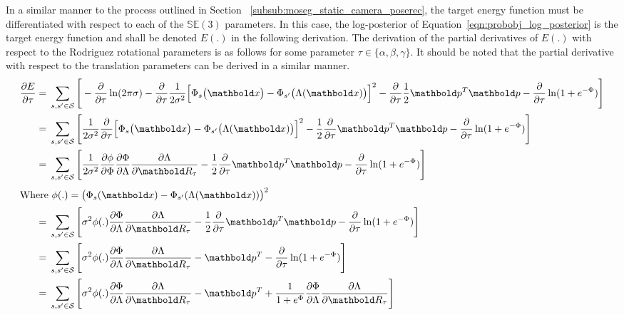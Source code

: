 In a similar manner to the process outlined in Section
~\ref{subsub:moseg_static_camera_poserec}, the target energy function must be
differentiated with respect to each of the \(\mathbb{SE}(3)\) parameters. In this
case, the log-posterior of Equation~\ref{eqn:probobj_log_posterior} is the
target energy function and shall be denoted \(E(.)\) in the following derivation.
The derivation of the partial derivatives of \(E(.)\) with respect
to the Rodriguez rotational parameters is as follows for some parameter
\( \tau \in \{ \alpha, \beta, \gamma \} \). It should be noted that the partial 
derivative with respect to the translation parameters can be derived in a similar 
manner.
\begin{align}
  \label{eqn:probobj_log_post_rot_grad}
  \frac{\partial E}{\partial \tau} ={}&
  \sum_{s, s' \in \mathcal{S}} \Bigg[ - \frac{\partial}{\partial \tau}
  \ln(2\pi\sigma) - \frac{\partial}{\partial \tau}
  \frac{1}{2\sigma^{2}}{\Big[\Phi_{s}\big(\bm{x}\big) -
  \Phi_{s'}\big(\Lambda(\bm{x})\big)\Big]}^{2} -
  \frac{\partial}{\partial \tau} \frac{1}{2} \bm{p}^{T}\bm{p} -
  \frac{\partial}{\partial \tau} \ln(1 + e^{-\Phi})
  \Bigg]\\
  ={}& \sum_{s, s' \in \mathcal{S}} \Bigg[ \frac{1}{2\sigma^{2}}
  \frac{\partial}{\partial \tau}
  {\Big[\Phi_{s}\big(\bm{x}\big) - \Phi_{s'}\big(\Lambda(\bm{x})\big)\Big]}^{2} -
  \frac{1}{2} \frac{\partial}{\partial \tau}
  \bm{p}^{T}\bm{p} - \frac{\partial}{\partial \tau} \ln(1 + e^{-\Phi})
  \Bigg]\\
  ={}& \sum_{s, s' \in \mathcal{S}} \Bigg[ \frac{1}{2\sigma^{2}}
  \frac{\partial \phi}{\partial \Phi} \frac{\partial \Phi}{\partial \Lambda}
  \frac{\partial \Lambda}{\partial \bm{R}_{\tau}} -
  \frac{1}{2} \frac{\partial}{\partial \tau}
  \bm{p}^{T}\bm{p} - \frac{\partial}{\partial \tau} \ln(1 + e^{-\Phi})
  \Bigg]\\
  \shortintertext{Where \(\phi(.) =
  {\big(\Phi_{s}(\bm{x}) - \Phi_{s'}(\Lambda(\bm{x}))\big)}^{2}\)}
  ={}& \sum_{s, s' \in \mathcal{S}} \Bigg[ \sigma^{2} \phi(.)
  \frac{\partial \Phi}{\partial \Lambda}
  \frac{\partial \Lambda}{\partial \bm{R}_{\tau}} -
  \frac{1}{2} \frac{\partial}{\partial \tau}
  \bm{p}^{T}\bm{p} - \frac{\partial}{\partial \tau} \ln(1 + e^{-\Phi})
  \Bigg]\\
  ={}& \sum_{s, s' \in \mathcal{S}} \Bigg[ \sigma^{2} \phi(.)
  \frac{\partial \Phi}{\partial \Lambda}
  \frac{\partial \Lambda}{\partial \bm{R}_{\tau}} - \bm{p}^{T} -
  \frac{\partial}{\partial \tau} \ln(1 + e^{-\Phi})
    \Bigg]\\
  ={}& \sum_{s, s' \in \mathcal{S}} \Bigg[ \sigma^{2} \phi(.)
  \frac{\partial \Phi}{\partial \Lambda}
  \frac{\partial \Lambda}{\partial \bm{R}_{\tau}} - \bm{p}^{T} +
  \frac{1}{1 + e^{\Phi}} \frac{\partial \Phi}{\partial \Lambda}
  \frac{\partial \Lambda}{\partial \bm{R}_{\tau}} 
  \Bigg]
\end{align}

